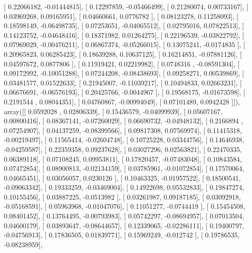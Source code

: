 \documentclass{article}
\begin{document}
       [ 0.22066182, -0.01444815],
       [ 0.12297859, -0.05466499],
       [ 0.21280074,  0.00733167],
       [ 0.03969268,  0.09165951],
       [ 0.04660661,  0.0776782 ],
       [ 0.08123278,  0.11258093],
       [ 0.18598149, -0.06498735],
       [ 0.07253651, -0.04065512],
       [ 0.02795016,  0.07822513],
       [ 0.14123752, -0.04648416],
       [ 0.18371982,  0.01264275],
       [ 0.22196539, -0.03822792],
       [ 0.07969029, -0.00476211],
       [ 0.06867374, -0.05266015],
       [ 0.13075241, -0.0174835 ],
       [ 0.20965823,  0.06285423],
       [ 0.18639288,  0.10637125],
       [ 0.16214851, -0.07881126],
       [ 0.04597672,  0.0877806 ],
       [ 0.11919421,  0.02219982],
       [ 0.0748316 , -0.08591304],
       [ 0.09172992, -0.10051288],
       [ 0.07244208, -0.08438693],
       [ 0.09258271,  0.00539869],
       [ 0.03481577,  0.01522633],
       [ 0.21945007, -0.11039217],
       [ 0.10494833,  0.02663231],
       [ 0.06676691, -0.06576193],
       [ 0.20425766, -0.0044967 ],
       [ 0.19568175, -0.01673598],
       [ 0.2191544 ,  0.08044351],
       [ 0.04760867, -0.00994049],
       [ 0.07101489,  0.0942428 ]]), array([[ 0.0592028 ,  0.02806339],
       [ 0.15436579, -0.04099939],
       [ 0.05607167,  0.00800416],
       [ 0.08367141, -0.07260029],
       [ 0.06690732, -0.04948132],
       [ 0.2166894 ,  0.07254907],
       [ 0.04137259, -0.08399566],
       [ 0.09817308,  0.07569974],
       [ 0.11415318, -0.00219497],
       [ 0.11565414, -0.02604748],
       [ 0.10725228,  0.03344756],
       [ 0.14646938, -0.04259587],
       [ 0.22359358,  0.09237628],
       [ 0.03027296,  0.02563821],
       [ 0.22470335,  0.06389118],
       [ 0.07108245,  0.09953811],
       [ 0.17820457, -0.07483048],
       [ 0.10843584,  0.07472854],
       [ 0.08900813, -0.02134159],
       [ 0.03785961, -0.01072854],
       [ 0.17570064,  0.04665451],
       [ 0.03056057,  0.0230126 ],
       [ 0.10463325, -0.01957522],
       [ 0.18500541, -0.09063342],
       [ 0.19333259, -0.03469004],
       [ 0.14922698,  0.05532833],
       [ 0.19847274,  0.10155456],
       [ 0.03887225, -0.0513982 ],
       [ 0.03261987,  0.09187185],
       [ 0.03092918, -0.05168591],
       [ 0.05963968, -0.01047076],
       [ 0.11051277, -0.0744419 ],
       [ 0.15454508,  0.08401452],
       [ 0.13764495, -0.00793983],
       [ 0.05742297, -0.08694957],
       [ 0.07013504,  0.04600179],
       [ 0.03893647, -0.08644657],
       [ 0.12339065, -0.02286111],
       [ 0.19400797, -0.04756913],
       [ 0.17836505,  0.01839771],
       [ 0.15969249, -0.012742  ],
       [ 0.19786535, -0.08238959],
\end{document}
